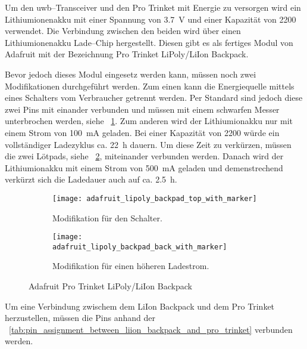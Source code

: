 Um den \gls{uwb}--Transceiver und den Pro Trinket mit Energie zu versorgen wird ein Lithiumionenakku mit einer Spannung von \SI{3.7}{\volt} und einer Kapazität von \SI{2200}{\mAh} verwendet. Die Verbindung zwischen den beiden wird über einen Lithiumionenakku Lade--Chip hergestellt. Diesen gibt es als fertiges Modul von Adafruit mit der Bezeichnung Pro Trinket LiPoly/LiIon Backpack.

Bevor jedoch dieses Modul eingesetz werden kann, müssen noch zwei Modifikationen durchgeführt werden. Zum einen kann die Energiequelle mittels eines Schalters vom Verbraucher getrennt werden. Per Standard sind jedoch diese zwei Pins mit einander verbunden und müssen mit einem schwarfen Messer unterbrochen werden, siehe \figurename~\ref{fig:pro_trinket_liion_backpack_top}. Zum anderen wird der Lithiumionakku nur mit einem Strom von \SI{100}{\mA} geladen. Bei einer Kapazität von \SI{2200}{\mAh} würde ein vollständiger Ladezyklus ca. \SI{22}{\hour} dauern. Um diese Zeit zu verkürzen, müssen die zwei Lötpads, siehe \figurename~\ref{fig:pro_trinket_liion_backpack_bottom}, miteinander verbunden werden. Danach wird der Lithiumionakku mit einem Strom von \SI{500}{\mA} geladen und demenstrechend verkürzt sich die Ladedauer auch auf ca. \SI{2.5}{\hour}.

\begin{figure}
	\centering
	\begin{subfigure}[t]{0.4\textwidth}
		\texttt{[image: adafruit\_lipoly\_backpad\_top\_with\_marker]}
		\caption{Modifikation für den Schalter.}
		\label{fig:pro_trinket_liion_backpack_top}
	\end{subfigure}
	\qquad
	\begin{subfigure}[t]{0.4\textwidth}
		\texttt{[image: adafruit\_lipoly\_backpad\_back\_with\_marker]}
		\caption{Modifikation für einen höheren Ladestrom.}
		\label{fig:pro_trinket_liion_backpack_bottom}
	\end{subfigure}
	\caption{Adafruit Pro Trinket LiPoly/LiIon Backpack}
	\label{fig:pro_trinket_liion_backpack}
\end{figure}

Um eine Verbindung zwischem dem LiIon Backpack und dem Pro Trinket herzustellen, müssen die Pins anhand der \tablename~\ref{tab:pin_assignment_between_liion_backpack_and_pro_trinket} verbunden werden.


